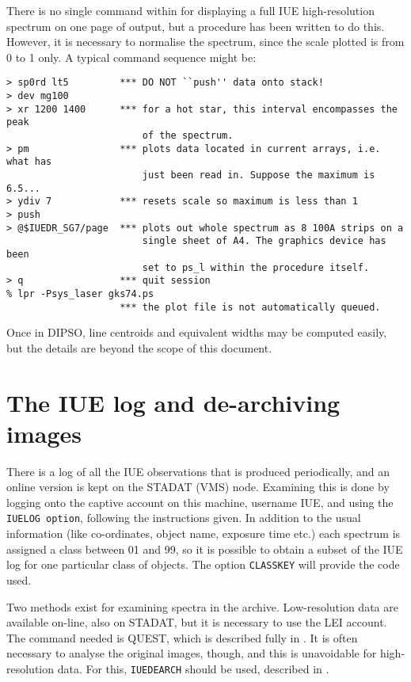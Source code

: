 There is no single command within  for displaying a 
full IUE
high-resolution spectrum on one page of output, but a procedure has been
written to do this.  However, it is necessary to normalise the spectrum,
since the scale plotted is from 0 to 1 only. A typical command sequence
might be:

\begin{verbatim}
> sp0rd lt5         *** DO NOT ``push'' data onto stack!
> dev mg100
> xr 1200 1400      *** for a hot star, this interval encompasses the peak
                        of the spectrum.
> pm                *** plots data located in current arrays, i.e. what has
                        just been read in. Suppose the maximum is 6.5...
> ydiv 7            *** resets scale so maximum is less than 1
> push
> @$IUEDR_SG7/page  *** plots out whole spectrum as 8 100A strips on a
                        single sheet of A4. The graphics device has been
                        set to ps_l within the procedure itself.
> q                 *** quit session
% lpr -Psys_laser gks74.ps
                    *** the plot file is not automatically queued.
\end{verbatim}

Once in DIPSO, line centroids and equivalent widths may be computed
easily, but the details are beyond the scope of this document.

\section{The IUE log and de-archiving images}

There is a log of all the IUE observations that is produced periodically, and
an online version is kept on the STADAT (VMS) node.  Examining this is done by
logging onto the captive account on this machine, username IUE, and using the
{\tt IUELOG option}, following the instructions given.  In addition to
the usual information (like co-ordinates, object name, exposure time etc.)
each spectrum is assigned a class between 01 and 99, so it is possible to
obtain a subset of the IUE log for one particular class of objects. The
option {\tt CLASSKEY} will provide the code used.

Two methods exist for examining spectra in the archive.  Low-resolution data
are available on-line, also on STADAT, but it is necessary to use the LEI
account.  The command needed is QUEST, which is described fully in
.  It is often necessary to analyse the original 
images, though,
and this is unavoidable for high-resolution data.  For this, {\tt IUEDEARCH}
should be used, described in .


